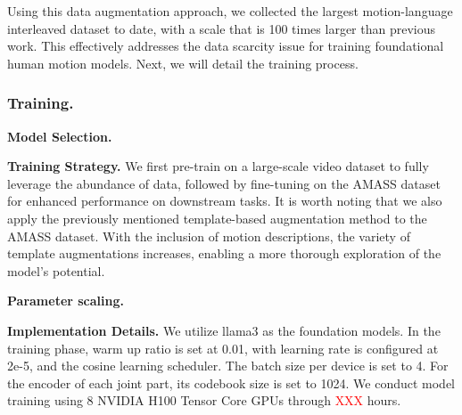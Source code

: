Using this data augmentation approach, we collected the largest motion-language interleaved dataset to date, with a scale that is 100 times larger than previous work. This effectively addresses the data scarcity issue for training foundational human motion models. Next, we will detail the training process.

\subsubsection{Training.}

\textbf{Model Selection.}

\textbf{Training Strategy.}
We first pre-train on a large-scale video dataset to fully leverage the abundance of data, followed by fine-tuning on the AMASS dataset for enhanced performance on downstream tasks.
It is worth noting that we also apply the previously mentioned template-based augmentation method to the AMASS dataset. With the inclusion of motion descriptions, the variety of template augmentations increases, enabling a more thorough exploration of the model's potential.

\textbf{Parameter scaling.}

\textbf{Implementation Details.}
We utilize llama3 as the foundation models. In the training phase, warm up ratio is set at 0.01, with learning rate is configured at 2e-5, and the cosine learning scheduler. The batch size per device is set to 4. For the encoder of each joint part, its codebook size is set to 1024. We conduct model training using 8 NVIDIA H100 Tensor Core GPUs through \textcolor{red}{XXX} hours. 




